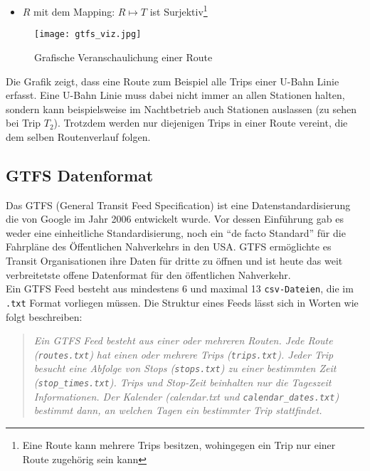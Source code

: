 \begin{newpage}
\begin{itemize}
          \item $R$ mit dem Mapping: $R \mapsto T$ ist Surjektiv\footnote{Eine Route kann mehrere Trips besitzen, wohingegen ein Trip nur einer Route zugehörig sein kann} 
        \end{itemize}     

        \begin{figure}[htbp]
          \begin{center}
            \texttt{[image: gtfs\_viz.jpg]}
            \caption{Grafische Veranschaulichung einer Route}
            \label{fig:gtfs_viz}
          \end{center}
        \end{figure}

        Die Grafik zeigt, dass eine Route zum Beispiel alle Trips einer U-Bahn Linie erfasst. Eine U-Bahn Linie muss dabei nicht immer an allen Stationen halten, sondern kann beispielsweise im Nachtbetrieb auch Stationen auslassen (zu sehen bei Trip $T_2$). Trotzdem werden nur diejenigen Trips in einer Route vereint, die dem selben Routenverlauf folgen.

  	\subsection{GTFS Datenformat}
  	\label{ssec:gtfs_datenformat}
  		Das GTFS (General Transit Feed Specification) ist eine Datenstandardisierung die von Google im Jahr 2006 entwickelt wurde. Vor dessen Einführung gab es weder eine einheitliche Standardisierung, noch ein "`de facto Standard"' für die Fahrpläne des Öffentlichen Nahverkehrs in den USA. GTFS ermöglichte es Transit Organisationen ihre Daten für dritte zu öffnen und ist heute das weit verbreitetste offene Datenformat für den öffentlichen Nahverkehr.\parencite[S. 2]{roush}\\

      Ein GTFS Feed besteht aus mindestens 6 und maximal 13 \texttt{csv-Dateien}, die im \texttt{.txt} Format vorliegen müssen. Die Struktur eines Feeds lässt sich in Worten wie folgt beschreiben:

      \begin{quote}
        \textit{Ein GTFS Feed besteht aus einer oder mehreren Routen. Jede Route (\texttt{routes.txt}) hat einen oder mehrere Trips (\texttt{trips.txt}). Jeder Trip besucht eine Abfolge von Stops (\texttt{stops.txt}) zu einer bestimmten Zeit (\texttt{stop\_times.txt}). Trips und Stop-Zeit beinhalten nur die Tageszeit Informationen. Der Kalender (calendar.txt und \texttt{calendar\_dates.txt}) bestimmt dann, an welchen Tagen ein bestimmter Trip stattfindet.} \cite[S. 8]{zervaas}
      \end{quote}


\end{newpage}
